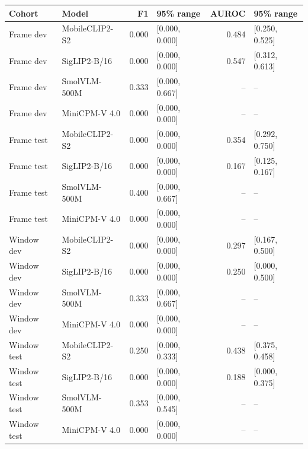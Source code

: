 \begin{longtable}{llrlrl}
\toprule
Cohort & Model & F1 & 95\% range & AUROC & 95\% range \\
\midrule\endhead
Frame dev & MobileCLIP2-S2 & 0.000 & [0.000, 0.000] & 0.484 & [0.250, 0.525] \\
Frame dev & SigLIP2-B/16 & 0.000 & [0.000, 0.000] & 0.547 & [0.312, 0.613] \\
Frame dev & SmolVLM-500M & 0.333 & [0.000, 0.667] & -- & -- \\
Frame dev & MiniCPM-V 4.0 & 0.000 & [0.000, 0.000] & -- & -- \\
Frame test & MobileCLIP2-S2 & 0.000 & [0.000, 0.000] & 0.354 & [0.292, 0.750] \\
Frame test & SigLIP2-B/16 & 0.000 & [0.000, 0.000] & 0.167 & [0.125, 0.167] \\
Frame test & SmolVLM-500M & 0.400 & [0.000, 0.667] & -- & -- \\
Frame test & MiniCPM-V 4.0 & 0.000 & [0.000, 0.000] & -- & -- \\
Window dev & MobileCLIP2-S2 & 0.000 & [0.000, 0.000] & 0.297 & [0.167, 0.500] \\
Window dev & SigLIP2-B/16 & 0.000 & [0.000, 0.000] & 0.250 & [0.000, 0.500] \\
Window dev & SmolVLM-500M & 0.333 & [0.000, 0.667] & -- & -- \\
Window dev & MiniCPM-V 4.0 & 0.000 & [0.000, 0.000] & -- & -- \\
Window test & MobileCLIP2-S2 & 0.250 & [0.000, 0.333] & 0.438 & [0.375, 0.458] \\
Window test & SigLIP2-B/16 & 0.000 & [0.000, 0.000] & 0.188 & [0.000, 0.375] \\
Window test & SmolVLM-500M & 0.353 & [0.000, 0.545] & -- & -- \\
Window test & MiniCPM-V 4.0 & 0.000 & [0.000, 0.000] & -- & -- \\
\bottomrule
\end{longtable}
